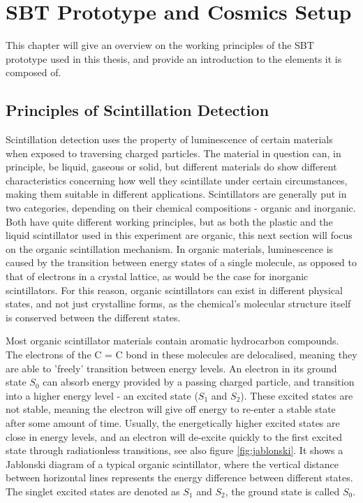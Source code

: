 \chapter{SBT Prototype and Cosmics Setup}\label{cosmics}

This chapter will give  an overview on the working principles of the \ac{SBT} prototype used in this thesis, and provide an introduction to the elements it is composed of.


\section{Principles of Scintillation Detection}

    Scintillation detection uses the property of luminescence of certain materials when exposed to traversing charged particles.
	The material in question can, in principle, be liquid, gaseous or solid, but different materials do show different characteristics concerning how well they scintillate under certain circumstances, making them suitable in different applications.
	Scintillators are generally put in two categories, depending on their chemical compositions - organic and inorganic.
	Both have quite different working principles, but as both the plastic and the liquid scintillator used in this experiment are organic, this next section will focus on the organic scintillation mechanism.
	In organic materials, luminescence is caused by the transition between energy states of a single molecule, as opposed to that of electrons in a crystal lattice, as would be the case for inorganic scintillators.
	For this reason, organic scintillators can exist in different physical states, and not just crystalline forms, as the chemical's molecular structure itself is conserved between the different states.

	Most organic scintillator materials contain aromatic hydrocarbon compounds.
	The electrons of the C = C bond in these molecules are delocalised, meaning they are able to 'freely' transition between energy levels.
	An electron in its ground state $S_0$ can absorb energy provided by a passing charged particle, and transition into a higher energy level - an excited state ($S_1$ and $S_2$).
	These excited states are not stable, meaning the electron will give off energy to re-enter a stable state after some amount of time.
	Usually, the energetically higher excited states are close in energy levels, and an electron will de-excite quickly to the first excited state through radiationless transitions, see also figure \ref{fig:jablonski}. It shows a Jablonski diagram of a typical organic scintillator, where the vertical distance between horizontal lines represents the energy difference between different states. The singlet excited states are denoted as $S_1$ and $S_2$, the ground state is called $S_0$.
	

